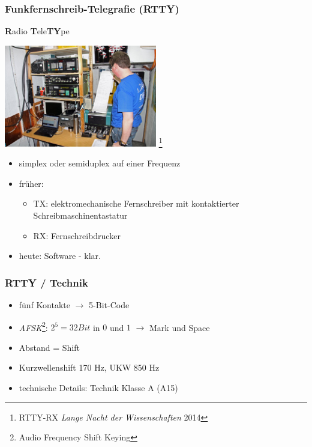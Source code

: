 \begin{frame}
    \frametitle{Funkfernschreib-Telegrafie (RTTY)}

    \textbf{R}adio \textbf{T}ele\textbf{TY}pe

    \begin{center}
        \includegraphics[width=0.5\textwidth]{e16/RTTY_LNDW2014.jpg}
        \footnote{RTTY-RX \emph{Lange Nacht der Wissenschaften} 2014}
    \end{center}


    \begin{itemize}
        \item simplex oder semiduplex auf einer Frequenz
        \item früher:
            \begin{itemize}
                \item TX: elektromechanische Fernschreiber mit kontaktierter
                      Schreibmaschinentastatur
                \item RX: Fernschreibdrucker
            \end{itemize}
        \item heute: Software - klar.
    \end{itemize}

\end{frame}

\begin{frame}
    \frametitle{RTTY / Technik}

    \begin{itemize}
        \item fünf Kontakte $\rightarrow$ 5-Bit-Code
        \item \emph{AFSK}\footnote{Audio Frequency Shift Keying}:
              $2^5 = 32 Bit$ in $0$ und $1$ $\rightarrow$ Mark und Space
        \item Abstand = Shift
        \item Kurzwellenshift 170 Hz, UKW 850 Hz
        \item technische Details: Technik Klasse A (A15)
    \end{itemize}

\end{frame}

